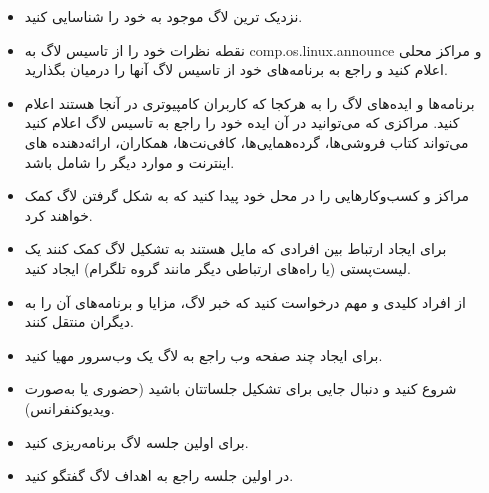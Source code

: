 \begin{itemize}
\item
نزدیک ترین لاگ موجود به خود را شناسایی کنید.
\item
نقطه نظرات خود را از تاسیس لاگ به
{\ttfamily comp.os.linux.announce}
و مراکز محلی اعلام کنید و راجع به برنامه‌های خود از تاسیس لاگ آنها را
درمیان بگذارید.
\item
برنامه‌ها و ایده‌های لاگ را به هرکجا که کاربران کامپیوتری در آنجا هستند
اعلام کنید. مراکزی که می‌توانید در آن ایده خود را راجع به تاسیس لاگ
اعلام کنید می‌تواند کتاب فروشی‌ها، گرده‌همایی‌ها، کافی‌نت‌ها، همکاران، ارائه‌دهنده
های اینترنت و موارد دیگر را شامل باشد.
\item
مراکز و کسب‌وکار‌هایی را در محل خود پیدا کنید که به شکل گرفتن لاگ کمک
خواهند کرد.
\item
برای ایجاد ارتباط بین افرادی که مایل هستند به تشکیل لاگ کمک کنند یک
لیست‌پستی (یا راه‌های ارتباطی دیگر مانند گروه تلگرام) ایجاد کنید.
\item
از افراد کلیدی و مهم درخواست کنید که خبر لاگ، مزایا و برنامه‌های آن
را به دیگران منتقل کنند.
\item
برای ایجاد چند صفحه وب راجع به لاگ یک وب‌سرور مهیا کنید.

\item
شروع کنید و دنبال جایی برای تشکیل جلساتتان باشید (حضوری یا به‌صورت
ویدیوکنفرانس).
\item
برای اولین جلسه لاگ برنامه‌ریزی کنید.
\item
در اولین جلسه راجع به اهداف لاگ گفتگو کنید.
\end{itemize}

